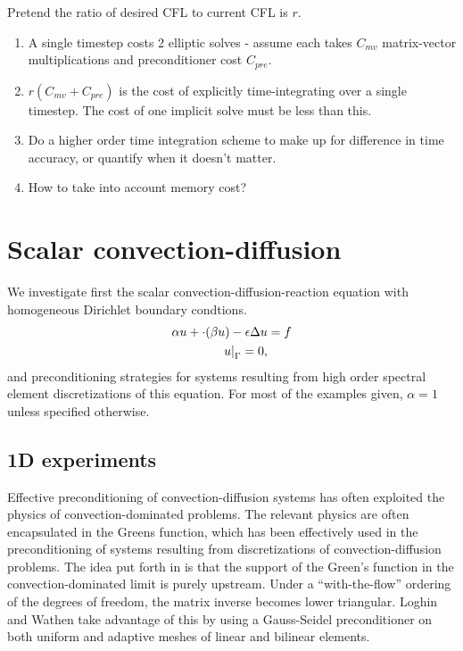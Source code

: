 \documentclass[final,leqno]{siamltex}
\let\grad\relax
\newcommand{\grad}{\nabla}
\renewcommand{\div}{\grad \cdot}
\begin{document}
Pretend the ratio of desired CFL to current CFL is $r$.
\begin{enumerate}
\item A single timestep costs 2 elliptic solves - assume each takes $C_{mv}$ matrix-vector multiplications and preconditioner cost $C_{pre}$.  
\item $r(C_{mv} + C_{pre})$ is the cost of explicitly time-integrating over a single timestep.  The cost of one implicit solve must be less than this.  
\item Do a higher order time integration scheme to make up for difference in time accuracy, or quantify when it doesn't matter.  
\item How to take into account memory cost?
\end{enumerate}

\section{Scalar convection-diffusion}

We investigate first the scalar convection-diffusion-reaction equation with homogeneous Dirichlet boundary condtions.  
\begin{align*}
\alpha u + \div(\beta u) - \epsilon \Delta u &= f\\
\left.u\right|_{\Gamma} = 0,
\end{align*}
and preconditioning strategies for systems resulting from high order spectral element discretizations of this equation.  For most of the examples given, $\alpha = 1$ unless specified otherwise.  

\subsection{1D experiments}

Effective preconditioning of convection-diffusion systems has often exploited the physics of convection-dominated problems.  The relevant physics are often encapsulated in the Greens function, which has been effectively used in the preconditioning of systems resulting from discretizations of convection-diffusion problems.  The idea put forth in \cite{Loghin97,Loghin99} is that the support of the Green's function in the convection-dominated limit is purely upstream.  Under a ``with-the-flow'' ordering of the degrees of freedom, the matrix inverse becomes lower triangular.  Loghin and Wathen take advantage of this by using a Gauss-Seidel preconditioner on both uniform and adaptive meshes of linear and bilinear elements.  
\end{document}
